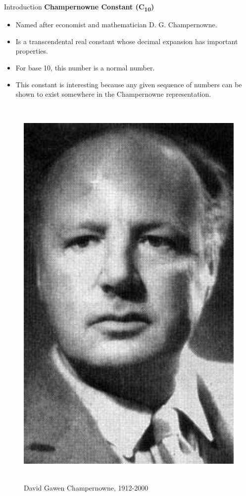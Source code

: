 \documentclass[final]{beamer}
\newlength{\onecolwid}
\begin{document}
\begin{frame}[t]
\begin{columns}[t]
\begin{column}{\onecolwid}
\begin{block}{Introduction}
\textbf{Champernowne Constant (C\textsubscript{10})}

\begin{itemize}
\item Named after economist and mathematician D. G. Champernowne.
\item Is a transcendental real constant whose decimal expansion has important properties.
\item For base 10, this number is a normal number.
\item This constant is interesting because any given sequence of numbers can be shown to exist somewhere in the Champernowne representation.
\end{itemize}

\end{block}
\vspace{1.5cm}

\begin{figure}
\includegraphics[width=16cm, height=20cm]{DGChampernowne.jpg}
\caption{David Gawen Champernowne, 1912-2000}
\end{figure}


\end{column}
\end{columns}
\end{frame}
\end{document}
